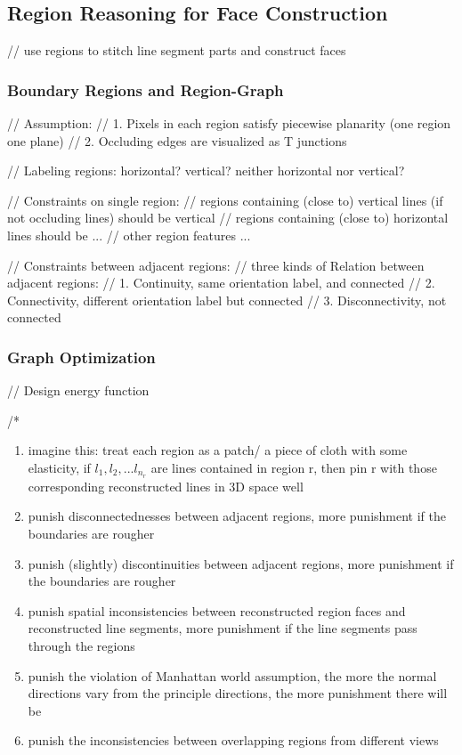 \documentclass[runningheads]{llncs}
\begin{document}
\subsection{Region Reasoning for Face Construction}

// use regions to stitch line segment parts and construct faces

\subsubsection {Boundary Regions and Region-Graph} %

// Assumption:
// 1. Pixels in each region satisfy piecewise planarity (one region one plane)
// 2. Occluding edges are visualized as T junctions

// Labeling regions: horizontal? vertical? neither horizontal nor vertical?


// Constraints on single region:
//  regions containing (close to) vertical lines (if not occluding lines) should be vertical 
//  regions containing (close to) horizontal lines should be ...
//	other region features ...

// Constraints between adjacent regions:
//   three kinds of Relation between adjacent regions:
//   1. Continuity, same orientation label, and connected
//   2. Connectivity, different orientation label but connected
//   3. Disconnectivity, not connected



\subsubsection {Graph Optimization}

// Design energy function

/*

\begin{enumerate}
  \item imagine this:
       treat each region as a patch/ a piece of cloth with some elasticity, 
       if $l_1, l_2, ... l_{n_r}$ are lines contained in region r,
       then pin r with those corresponding reconstructed lines in 3D space
       well 
  \item punish disconnectednesses between adjacent regions, more punishment if the boundaries are rougher
  \item punish (slightly) discontinuities between adjacent regions, more punishment if the boundaries are rougher
  \item punish spatial inconsistencies between reconstructed region faces and reconstructed line segments, 
  	more punishment if the line segments pass through the regions
  \item punish the violation of Manhattan world assumption, the more the normal directions vary from the principle directions, 
		the more punishment there will be
  \item punish the inconsistencies between overlapping regions from different views
\end{enumerate}
\end{document}
